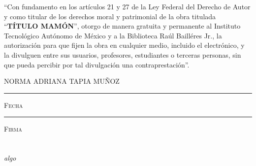 \documentclass[11pt]{book}
\begin{document}


\thispagestyle{empty}
\vspace*{\fill}
\begingroup
``Con fundamento en los artículos 21 y 27 de la Ley Federal del Derecho de Autor y como titular de los derechos moral y patrimonial de la obra titulada ``\textbf{TÍTULO MAMÓN}'', otorgo de manera gratuita y permanente al Instituto Tecnológico Autónomo de México y a la Biblioteca Raúl Bailléres Jr., la autorización para que fijen la obra en cualquier medio, incluido el electrónico, y la divulguen entre sus usuarios, profesores, estudiantes o terceras personas, sin que pueda percibir por tal divulgación una contraprestación''.

\centering

\hspace{3em}

\textsc{NORMA ADRIANA TAPIA MUÑOZ}

\vspace{5em}

\rule[1em]{20em}{0.5pt} %

\textsc{Fecha}

\vspace{8em}

\rule[1em]{20em}{0.5pt} %

\textsc{Firma}

\endgroup
\vspace*{\fill}



\pagestyle{empty}
\frontmatter

\chapter*{}
\begin{flushright}
	\textit{algo}
\end{flushright}


\end{document}
